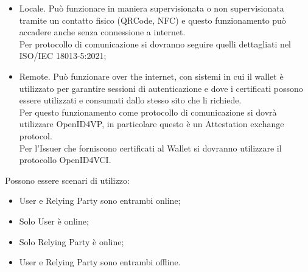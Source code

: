     \begin{itemize}
        \item Locale. Può funzionare in maniera supervisionata o non supervisionata tramite un contatto fisico (QRCode, NFC) e questo funzionamento può accadere anche senza connessione a internet.\\
        Per protocollo di comunicazione si dovranno seguire quelli dettagliati nel
        ISO/IEC 18013-5:2021;
        \item Remote. Può funzionare over the internet, con sistemi in cui il wallet è utilizzato per garantire sessioni di autenticazione e dove i certificati possono essere utilizzati e consumati dallo stesso sito che li richiede.
        \\Per questo funzionamento come protocollo di comunicazione si dovrà utilizzare OpenID4VP, in particolare questo è un Attestation exchange protocol.
        \\Per l'Issuer che forniscono certificati al Wallet si dovranno utilizzare il protocollo OpenID4VCI.
    \end{itemize}

    Possono essere scenari di utilizzo:
    \begin{itemize}
        \item User e Relying Party sono entrambi online;
        \item Solo User è online;
        \item Solo Relying Party è online;
        \item User e Relying Party sono entrambi offline.
    \end{itemize}